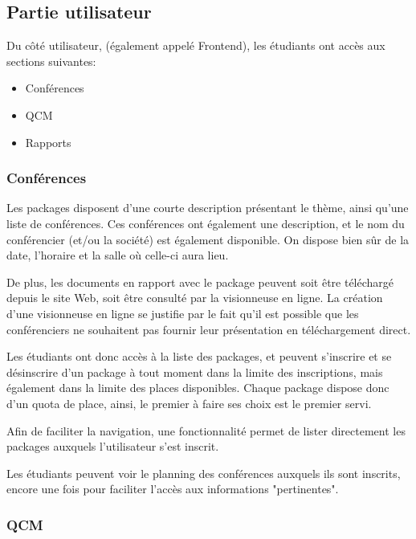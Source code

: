         \subsection{Partie utilisateur}

Du côté utilisateur, (également appelé Frontend), les étudiants ont accès aux sections
suivantes:

    \begin{itemize}
    \item Conférences
    \item QCM
    \item Rapports
    \end{itemize}

            \subsubsection{Conférences}

Les packages disposent d'une courte description présentant le thème, ainsi qu'une
liste de conférences. Ces conférences ont également une description, et le nom du
conférencier (et/ou la société) est également disponible.
On dispose bien sûr de la date, l'horaire et la salle où celle-ci aura lieu.

De plus, les documents en rapport avec le package peuvent soit être téléchargé
depuis le site Web, soit être consulté par la visionneuse en ligne. La création
d'une visionneuse en ligne se justifie par le fait qu'il est possible que les
conférenciers ne souhaitent pas fournir leur présentation en téléchargement direct.

Les étudiants ont donc accès à la liste des packages, et peuvent s'inscrire et
se désinscrire d'un package à tout moment dans la limite des inscriptions, mais
également dans la limite des places disponibles.
Chaque package dispose donc d'un quota de place, ainsi, le premier à faire ses choix
est le premier servi.

Afin de faciliter la navigation, une fonctionnalité permet de lister directement
les packages auxquels l'utilisateur s'est inscrit.

Les étudiants peuvent voir le planning des conférences auxquels ils sont inscrits,
encore une fois pour faciliter l'accès aux informations "pertinentes".

            \subsubsection{QCM}

